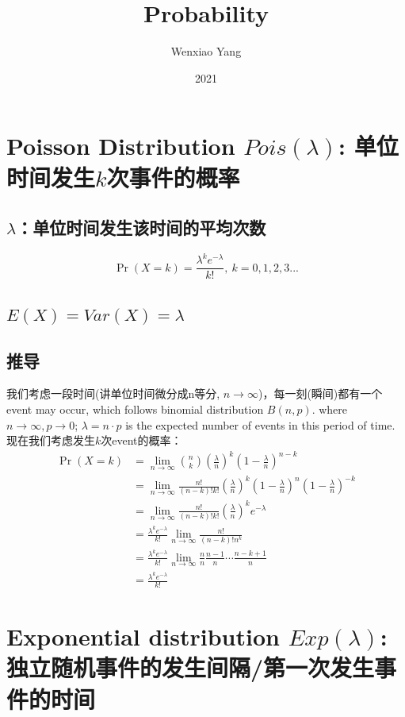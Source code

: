 \documentclass[11pt,a4paper]{article}
\title{Probability}
\author[*]{Wenxiao Yang}
\affil[*]{Department of Mathematics, University of Illinois at Urbana-Champaign}
\date{2021}
\begin{document}
\maketitle
\tableofcontents
\newpage


\section{Poisson Distribution $Pois(\lambda)$: 单位时间发生$k$次事件的概率}
\subsection{$\lambda$：单位时间发生该时间的平均次数}
$$\Pr(X{=}k)= \frac{\lambda^k e^{-\lambda}}{k!},\ k=0,1,2,3...$$
\subsection{$E(X)=Var(X)=\lambda$}
\subsection{推导}
我们考虑一段时间(讲单位时间微分成n等分, $n \rightarrow \infty$)，每一刻(瞬间)都有一个event may occur, which follows binomial distribution $B(n,p)$. where $n \rightarrow \infty, p \rightarrow 0$; $\lambda=n\cdot p$ is the expected number of events in this period of time.\\
现在我们考虑发生$k$次event的概率：
\begin{equation}
    \begin{aligned}
        \Pr(X=k)&=\lim_{n \rightarrow\infty} \binom{n}{k} (\frac{\lambda}{n})^k(1-\frac{\lambda}{n})^{n-k}\\
        &=\lim_{n \rightarrow\infty} \frac{n!}{(n-k)!k!} (\frac{\lambda}{n})^k(1-\frac{\lambda}{n})^{n}(1-\frac{\lambda}{n})^{-k}\\
        &=\lim_{n \rightarrow\infty}\frac{n!}{(n-k)!k!} (\frac{\lambda}{n})^k e^{-\lambda}\\
        &=\frac{\lambda^k e^{-\lambda}}{k!}\lim_{n \rightarrow\infty}\frac{n!}{(n-k)!n^k}\\
        &=\frac{\lambda^k e^{-\lambda}}{k!}\lim_{n \rightarrow\infty}
        \frac{n}{n}\frac{n-1}{n}\cdots \frac{n-k+1}{n}\\
        &=\frac{\lambda^k e^{-\lambda}}{k!}
    \end{aligned}
    \nonumber
\end{equation}




\section{Exponential distribution $Exp(\lambda)$: 独立随机事件的发生间隔/第一次发生事件的时间}
\end{document}
